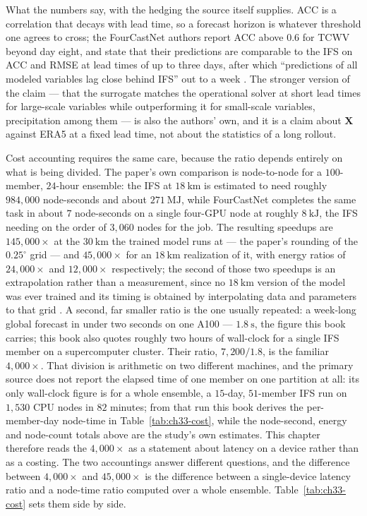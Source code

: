 What the numbers say, with the hedging the source itself supplies. ACC is a correlation
that decays with lead time, so a forecast horizon is whatever threshold one agrees to
cross; the FourCastNet authors report ACC above $0.6$ for TCWV beyond day eight, and state
that their predictions are comparable to the IFS on ACC and RMSE at lead times of up to
three days, after which ``predictions of all modeled variables lag
close behind IFS'' out to a week \cite{pathak2022fourcastnet}. The stronger version of the
claim --- that the surrogate matches the operational solver at short lead times for
large-scale variables while outperforming it for small-scale variables, precipitation among
them --- is also the authors' own, and it is a claim
about $\mathbf{X}$ against ERA5 at a fixed lead time, not about the statistics of a long
rollout. 

Cost accounting requires the same care, because the ratio depends entirely on what is being
divided. The paper's own comparison is node-to-node for a $100$-member, $24$-hour ensemble:
the IFS at $18\ \mathrm{km}$ is estimated to need roughly $984{,}000$ node-seconds and about
$271\ \mathrm{MJ}$, while FourCastNet completes the same task in about $7$ node-seconds on
a single four-GPU node at roughly $8\ \mathrm{kJ}$, the IFS needing on the order of
$3{,}060$ nodes for the job. The resulting speedups are $145{,}000\times$ at the
$30\ \mathrm{km}$ the trained model runs at --- the paper's rounding of the
$0.25^\circ$ grid --- and $45{,}000\times$ for an $18\ \mathrm{km}$ realization of it, with
energy ratios of $24{,}000\times$ and $12{,}000\times$ respectively; the second of those two
speedups is an extrapolation rather than a
measurement, since no $18\ \mathrm{km}$ version of the model was ever trained and its
timing is obtained by interpolating data and parameters to that grid
\cite{pathak2022fourcastnet}. A second, far smaller ratio is the one usually repeated: a
week-long global forecast in under two seconds on one A100 --- $1.8\ \mathrm{s}$, the
figure this book carries; this book also quotes roughly two hours of
wall-clock for a single IFS member on a supercomputer cluster. Their ratio,
$7{,}200/1.8$, is the familiar $4{,}000\times$. That division is arithmetic on two different
machines, and the primary source does not report the elapsed time of one member on one
partition at all: its only wall-clock figure is for a whole ensemble, a $15$-day,
$51$-member IFS run on $1{,}530$ CPU nodes in $82$ minutes; from that run this book
derives the per-member-day node-time in Table~\ref{tab:ch33-cost}, while the
node-second, energy and node-count totals above are the study's own estimates. This chapter therefore reads the $4{,}000\times$ as a statement
about latency on a device rather than as a costing. The two accountings answer different
questions, and the
difference between $4{,}000\times$ and $45{,}000\times$ is the difference between a single-device
latency ratio and a node-time ratio computed over a whole ensemble. Table~\ref{tab:ch33-cost} sets them side by side. 

